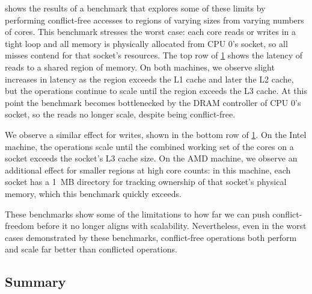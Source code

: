\begin{figure}
  \centering
  \label{fig:memscan}
\end{figure}

 shows the results of a benchmark that explores some
of these limits by performing conflict-free accesses to regions of
varying sizes from varying numbers of cores.
%
This benchmark stresses the worst case: each core reads or writes in a
tight loop and all memory is physically allocated from CPU 0's socket,
so all misses contend for that socket's resources.
%
The top row of \cref{fig:memscan} shows the latency of reads to a
shared region of memory.
%
On both
machines, we observe slight increases in latency as the region exceeds
the L1 cache and later the L2 cache, but the operations continue to
scale until the region exceeds the L3 cache.  At this point the
benchmark becomes bottlenecked by the DRAM controller of CPU 0's
socket, so the reads no longer scale, despite being conflict-free.

We observe a similar effect for writes, shown in the bottom row of
\cref{fig:memscan}.  On the Intel machine, the operations scale until
the combined working set of the cores on a socket exceeds the socket's
L3 cache size.  On the AMD machine, we observe an additional
effect for smaller regions at high core counts: in this machine,
each socket has a 1~MB directory for tracking ownership of that
socket's physical memory, which this benchmark quickly exceeds.

These benchmarks show some of the limitations to how far we can push
conflict-freedom before it no longer aligns with scalability.
Nevertheless, even in the worst cases demonstrated by these
benchmarks, conflict-free operations both perform and scale far better
than conflicted operations.



\subsection{Summary}

